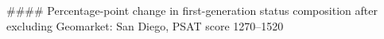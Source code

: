 #### Percentage-point change in first-generation status composition after excluding Geomarket: San Diego, PSAT score 1270–1520
